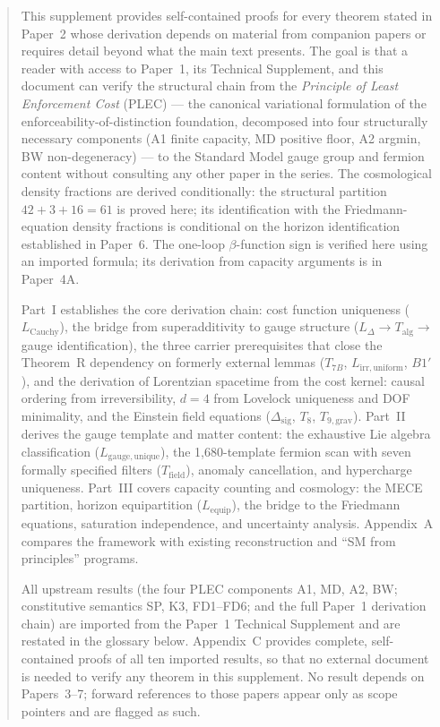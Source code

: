 \documentclass[11pt,a4paper]{article}
\theoremstyle{definition}
\begin{document}
\begin{abstract}
\noindent
This supplement provides self-contained proofs for every theorem stated in Paper~2 whose derivation depends on material from companion papers or requires detail beyond what the main text presents.  The goal is that a reader with access to Paper~1, its Technical Supplement, and this document can verify the structural chain from the \emph{Principle of Least Enforcement Cost} (PLEC) --- the canonical variational formulation of the enforceability-of-distinction foundation, decomposed into four structurally necessary components (A1 finite capacity, MD positive floor, A2 argmin, BW non-degeneracy) --- to the Standard Model gauge group and fermion content without consulting any other paper in the series.  The cosmological density fractions are derived conditionally: the structural partition $42 + 3 + 16 = 61$ is proved here; its identification with the Friedmann-equation density fractions is conditional on the horizon identification established in Paper~6.  The one-loop $\beta$-function sign is verified here using an imported formula; its derivation from capacity arguments is in Paper~4A.

Part~I establishes the core derivation chain: cost function uniqueness ($L_{\mathrm{Cauchy}}$), the bridge from superadditivity to gauge structure ($L_\Delta \to T_{\mathrm{alg}} \to$ gauge identification), the three carrier prerequisites that close the Theorem~R dependency on formerly external lemmas ($T_{7B}$, $L_{\mathrm{irr,uniform}}$, $B1'$), and the derivation of Lorentzian spacetime from the cost kernel: causal ordering from irreversibility, $d = 4$ from Lovelock uniqueness and DOF minimality, and the Einstein field equations ($\Delta_{\mathrm{sig}}$, $T_8$, $T_{9,\mathrm{grav}}$).  Part~II derives the gauge template and matter content: the exhaustive Lie algebra classification ($L_{\mathrm{gauge,unique}}$), the 1{,}680-template fermion scan with seven formally specified filters ($T_{\mathrm{field}}$), anomaly cancellation, and hypercharge uniqueness.  Part~III covers capacity counting and cosmology: the MECE partition, horizon equipartition ($L_{\mathrm{equip}}$), the bridge to the Friedmann equations, saturation independence, and uncertainty analysis.  Appendix~A compares the framework with existing reconstruction and ``SM from principles'' programs.

All upstream results (the four PLEC components A1, MD, A2, BW; constitutive semantics SP, K3, FD1--FD6; and the full Paper~1 derivation chain) are imported from the Paper~1 Technical Supplement and are restated in the glossary below.  Appendix~C provides complete, self-contained proofs of all ten imported results, so that no external document is needed to verify any theorem in this supplement.  No result depends on Papers~3--7; forward references to those papers appear only as scope pointers and are flagged as such.
\end{abstract}
\end{document}
